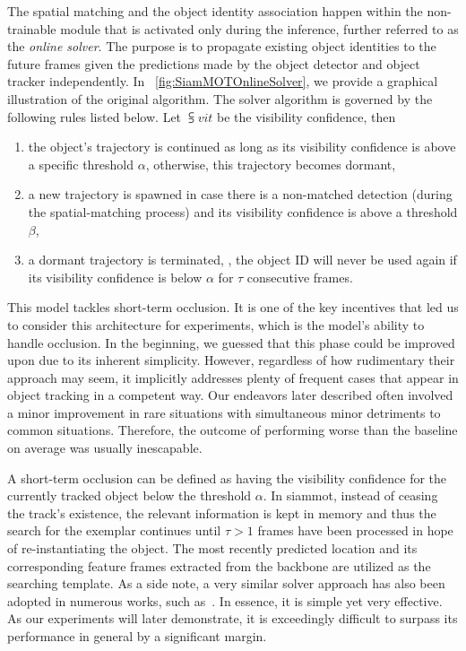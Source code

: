 The spatial matching and the object identity association happen within the non-trainable module that is activated only during the inference, further referred to as the \emph{online solver}. The purpose is to propagate existing object identities to the future frames given the predictions made by the object detector and object tracker independently. In \figtext{}~\ref{fig:SiamMOTOnlineSolver}, we provide a graphical illustration of the original algorithm. The solver algorithm is governed by the following rules listed below. Let $\subsup{v}{i}{t}$ be the visibility confidence, then
\begin{enumerate}
    \item the object's trajectory is continued as long as its visibility confidence is above a specific threshold $\alpha$, otherwise, this trajectory becomes dormant,
    \item a new trajectory is spawned in case there is a non-matched detection (during the spatial-matching process) and its visibility confidence is above a threshold $\beta$,
    \item a dormant trajectory is terminated, \ietext{}, the object ID will never be used again if its visibility confidence is below $\alpha$ for $\tau$ consecutive frames.
\end{enumerate}

This model tackles short-term occlusion. It is one of the key incentives that led us to consider this architecture for experiments, which is the model's ability to handle occlusion. In the beginning, we guessed that this phase could be improved upon due to its inherent simplicity. However, regardless of how rudimentary their approach may seem, it implicitly addresses plenty of frequent cases that appear in object tracking in a competent way. Our endeavors later described often involved a minor improvement in rare situations with simultaneous minor detriments to common situations. Therefore, the outcome of performing worse than the baseline on average was usually inescapable.

A short-term occlusion can be defined as having the visibility confidence for the currently tracked object below the threshold $\alpha$. In \gls{siammot}, instead of ceasing the track's existence, the relevant information is kept in memory and thus the search for the exemplar continues until $\tau > 1$ frames have been processed in hope of re-instantiating the object. The most recently predicted location and its corresponding feature frames extracted from the backbone are utilized as the searching template. As a side note, a very similar solver approach has also been adopted in numerous works, such as~\cite{bawley2016simple, wojke2017simple, zhou2020tracking, bergmann2019tracking}. In essence, it is simple yet very effective. As our experiments will later demonstrate, it is exceedingly difficult to surpass its performance in general by a significant margin.

